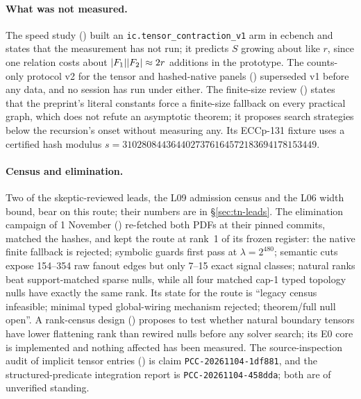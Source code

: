 \paragraph{What was not measured.} The speed study
() built an
\texttt{ic.tensor\_contraction\_v1} arm in ecbench and states that the
measurement has not run; it predicts $S$ growing about like $r$, since one
relation costs about $\lvert F_1 \rvert\lvert F_2 \rvert\approx2r$ additions in the
prototype. The counts-only protocol v2 for the tensor and hashed-native
panels () superseded v1 before any
data, and no session has run under either. The finite-size review
() states that the
preprint's literal constants force a finite-size fallback on every
practical graph, which does not refute an asymptotic theorem; it proposes
search strategies below the recursion's onset without measuring any. Its
ECCp-131 fixture uses a certified hash modulus
$s=3102808443644027376164572183694178153449$.

\paragraph{Census and elimination.} Two of the skeptic-reviewed leads, the
L09 admission census and the L06 width bound, bear on this route; their
numbers are in \S\ref{sec:tn-leads}. The elimination campaign of 1
November () re-fetched both
PDFs at their pinned commits, matched the hashes, and kept the route at
rank~1 of its frozen register: the native finite fallback is rejected;
symbolic guards first pass at $\lambda=2^{480}$; semantic cuts expose
154--354 raw fanout edges but only 7--15 exact signal classes; natural ranks
beat support-matched sparse nulls, while all four matched cap-1 typed
topology nulls have exactly the same rank. Its state for the route is
``legacy census infeasible; minimal typed global-wiring mechanism
rejected; theorem/full null open''. A rank-census design
() proposes to test
whether natural boundary tensors have lower flattening rank than rewired
nulls before any solver search; its E0 core is implemented and nothing
affected has been measured. The source-inspection audit of implicit tensor
entries () is claim
\texttt{PCC-20261104-1df881}, and the structured-predicate integration
report is \texttt{PCC-20261104-458dda}; both are of unverified standing.

